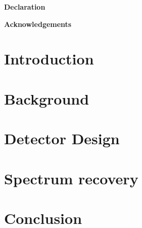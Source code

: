 \documentclass[12pt,twoside]{report}
\date{May 2022}
\begin{document}




\clearpage{\pagestyle{empty}\cleardoublepage}
\setcounter{page}{1}
\pagestyle{fancy}


\vspace*{\fill}
\begin{center}
	\textbf{Declaration}\\
\end{center}
\vspace*{\fill}
\newpage
\begin{abstract}

\end{abstract}
\newpage

\vspace*{\fill}
\begin{center}
	\textbf{Acknowledgements}\\

\end{center}
\vspace*{\fill}
\newpage

\tableofcontents
\listoffigures

\clearpage{\pagestyle{empty}\cleardoublepage}
\setcounter{page}{1}
\fancyhead[LE,RO]{\slshape \rightmark}
\fancyhead[LO,RE]{\slshape \leftmark}

\chapter{Introduction}
\label{Intro}

\chapter{Background}
\label{Background}

\chapter{Detector Design}
\label{DetDesign}

\chapter{Spectrum recovery}
\label{SpecRec}

\chapter{Conclusion}
\label{Conclusion}



\end{document}
